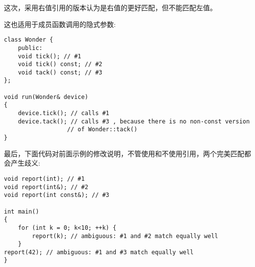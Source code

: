 这次，采用右值引用的版本认为是右值的更好匹配，但不能匹配左值。

这也适用于成员函数调用的隐式参数:

\begin{lstlisting}[style=styleCXX]
class Wonder {
	public:
	void tick(); // #1
	void tick() const; // #2
	void tack() const; // #3
};

void run(Wonder& device)
{
	device.tick(); // calls #1
	device.tack(); // calls #3 , because there is no non-const version
				  // of Wonder::tack()
}
\end{lstlisting}

最后，下面代码对前面示例的修改说明，不管使用和不使用引用，两个完美匹配都会产生歧义:

\begin{lstlisting}[style=styleCXX]
void report(int); // #1
void report(int&); // #2
void report(int const&); // #3

int main()
{
	for (int k = 0; k<10; ++k) {
		report(k); // ambiguous: #1 and #2 match equally well
	}
report(42); // ambiguous: #1 and #3 match equally well
}
\end{lstlisting}








